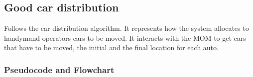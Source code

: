 \documentclass{article}
\begin{document}
		\subsection{Good car distribution} \label{sec:carDistribution}
		Follows the car distribution algorithm. It represents how the system allocates to handymand operators cars to be moved. It interacts with the MOM to get cars that have to be moved, the initial and the final location for each auto.
			\subsubsection{Pseudocode and Flowchart}
			
			\begin{minipage}{\linewidth}
			\end{minipage}
			\pagebreak
			
	
	
\end{document}
